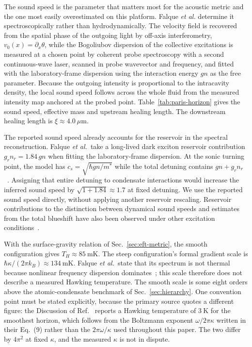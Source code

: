 \documentclass[aps,prd,reprint,nofootinbib,superscriptaddress]{revtex4-2}
\begin{document}
The sound speed is the parameter that matters most for the acoustic
metric and the one most easily overestimated on this platform. Falque
\emph{et al.} determine it spectroscopically rather than
hydrodynamically. The velocity field is recovered from the spatial phase
of the outgoing light by off-axis interferometry,
$v_0(x) = \partial_x\theta$, while the Bogoliubov dispersion of the
collective excitations is measured at a chosen point by coherent probe
spectroscopy with a second continuous-wave laser, scanned in probe
wavevector and frequency, and fitted with the laboratory-frame
dispersion using the interaction energy $gn$ as the free parameter.
Because the outgoing intensity is proportional to the intracavity
density, the local sound speed follows across the whole fluid from the
measured intensity map anchored at the probed point.
Table~\ref{tab:paris-horizon} gives the sound speed, effective mass
and upstream healing length. The downstream healing length is
$\xi \approx 4.0~\mu\mathrm{m}$.

The reported sound speed already accounts for the reservoir in the
spectral reconstruction. Falque \emph{et al.}\ take a long-lived dark
exciton reservoir contribution $g_r n_r = 1.84\,gn$ when fitting the
laboratory-frame dispersion. At the sonic turning point, the model has
$c_s = \sqrt{\hbar gn/m^*}$ while the total detuning contains
$gn+g_rn_r$~\cite{Falque2025,Claude2023}. Assigning that entire detuning
to condensate interactions would increase the inferred sound speed by
$\sqrt{1+1.84} \approx 1.7$ at fixed detuning. We use the reported sound speed directly, without applying another
reservoir rescaling. Reservoir
contributions to the distinction between dynamical sound speeds and
estimates from the total blueshift have also been observed under other
excitation conditions~\cite{Estrecho2021,Stepanov2019}.

With the surface-gravity relation of Sec.~\ref{sec:eft-metric}, the smooth
configuration gives $T_H \approx 85~\mathrm{mK}$. The steep configuration's
formal gradient scale is $\hbar\kappa/(2\pi k_B)\approx134~\mathrm{mK}$.
Falque \emph{et al.}\ state that its spectrum is not thermal because
nonlinear frequency dispersion dominates~\cite{Falque2025}; this scale
therefore does not describe a measured Hawking temperature. The smooth
scale is some eight orders above the atomic-condensate benchmark of
Sec.~\ref{sec:hierarchy}. One convention point must be stated
explicitly, because the primary source quotes a different figure: the
Discussion of Ref.~\cite{Falque2025} reports a Hawking temperature of
$3~\mathrm{K}$ for the smoothest horizon, which follows from the
Boltzmann exponent $\omega/2\pi\kappa$ written in their Eq.~(9) rather
than the $2\pi\omega/\kappa$ used throughout this paper. The two differ
by $4\pi^2$ at fixed $\kappa$, and the measured $\kappa$ is not in
dispute.
\end{document}
